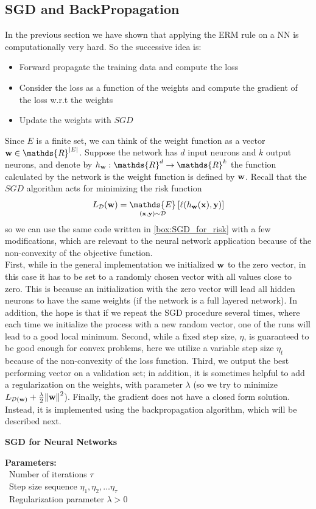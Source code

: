 \documentclass[12pt]{report}
\theoremstyle{plain}
\newcommand\mcl[1]{\mathcal{#1}}
\begin{document}
\begin{flushleft}
\section{SGD and BackPropagation}
In the previous section we have shown that applying the ERM rule on a NN is computationally very hard. So the successive idea is:
\begin{itemize}
	\item Forward propagate the training data and compute the loss
	\item Consider the loss as a function of the weights and compute the gradient of the loss w.r.t the weights
	\item Update the weights with $SGD$
\end{itemize}
Since $E$ is a finite set, we can think of the weight function as a vector $\vb{w}\in\mathds{R}^{\abs{E}}$. Suppose the network has $d$ input neurons and $k$ output neurons, and denote by $h_{\vb{w}}:\mathds{R}^d\to\mathds{R}^k$ the function calculated by the network is the weight function is defined by $\vb{w}$. Recall that the $SGD$ algorithm acts for minimizing the risk function
\[ L_{\mcl{D}}(\vb{w})=\underset{(\vb{x},\vb{y})\sim\mcl{D}}{\mathds{E}}\left[\ell(h_{\vb{w}}(\vb{x}),\vb{y})\right] \]
so we can use the same code written in \ref{box:SGD_for_risk} with a few modifications, which are relevant to the neural network application because of the non-convexity of the objective function.\\
First, while in the general implementation we initialized $\vb{w}$ to the zero vector, in this case it has to be set to a randomly chosen vector with all values close to zero. This is because an initialization with the zero vector will lead all hidden neurons to have the same weights (if the network is a full layered network). In addition, the hope is that if we repeat the SGD procedure several times, where each time we initialize the process with
a new random vector, one of the runs will lead to a good local minimum. Second, while a fixed step size, $\eta$, is guaranteed to be good enough for convex problems, here we utilize a variable step size $\eta_t$ because of the non-convexity of the loss function. Third, we output the best performing vector on a validation set; in addition, it is sometimes helpful to add a regularization on the weights, with parameter $\lambda$ (so we try to minimize $L_{\mcl{D}(\vb{w})}+\frac{\lambda}{2}\norm{\vb{w}}^2$). Finally, the gradient does not have a closed form solution. Instead, it is implemented using the backpropagation algorithm, which will be described next.
\begin{tcolorbox}
	\begin{center}
		\textbf{SGD for Neural Networks}
	\end{center}
	\textbf{Parameters:}\\
	\-\ \quad Number of iterations $\tau$\\
	\-\ \quad Step size sequence $\eta_1,\eta_2,\dots\eta_\tau$\\
	\-\ \quad Regularization parameter $\lambda>0$\\
	

\end{tcolorbox}
\end{flushleft}
\end{document}
